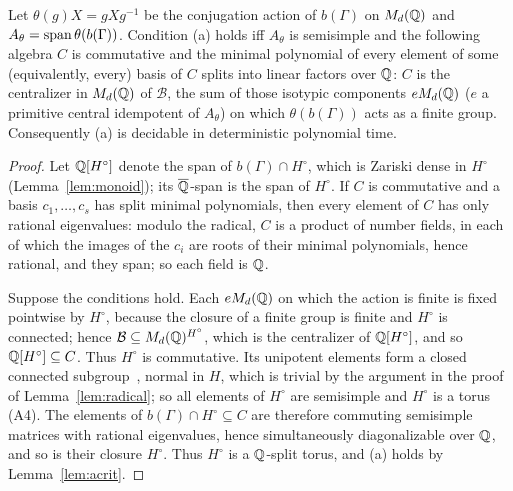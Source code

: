 \begin{lemma}\label{lem:atest}
Let $\theta(g)X=gXg^{-1}$ be the conjugation action of $b(\Gamma)$ on $M_d(\mathbb{Q})$ and
$A_\theta=\operatorname{span}\theta(b(\Gamma))$. Condition (a) holds iff $A_\theta$ is semisimple and the following
algebra $C$ is commutative and the minimal polynomial of every element of some (equivalently, every)
basis of $C$ splits into linear factors over $\mathbb{Q}$: $C$ is the centralizer in $M_d(\mathbb{Q})$ of $\mathcal B$,
the sum of those isotypic components $eM_d(\mathbb{Q})$ ($e$ a primitive central idempotent of $A_\theta$) on
which $\theta(b(\Gamma))$ acts as a finite group. Consequently (a) is decidable in deterministic
polynomial time.
\end{lemma}
\begin{proof}
Let $\mathbb{Q}[H^\circ]$ denote the span of $b(\Gamma)\cap H^\circ$, which is Zariski dense in $H^\circ$
(Lemma~\ref{lem:monoid}); its $\overline{\mathbb{Q}}$-span is the span of $H^\circ$. If $C$ is commutative and a basis
$c_1,\ldots,c_s$ has split minimal polynomials, then every element of $C$ has only rational eigenvalues:
modulo the radical, $C$ is a product of number fields, in each of which the images of the $c_i$ are
roots of their minimal polynomials, hence rational, and they span; so each field is $\mathbb{Q}$.

Suppose the conditions hold. Each $eM_d(\mathbb{Q})$ on which the action is finite is fixed pointwise by
$H^\circ$, because the closure of a finite group is finite and $H^\circ$ is connected; hence
$\mathcal B\subseteq M_d(\mathbb{Q})^{H^\circ}$, which is the centralizer of $\mathbb{Q}[H^\circ]$, and so
$\mathbb{Q}[H^\circ]\subseteq C$. Thus $H^\circ$ is commutative. Its unipotent elements form a closed connected
subgroup~\cite[4.7]{Bor91}, normal in $H$, which is trivial by the argument in the proof of
Lemma~\ref{lem:radical}; so all elements of $H^\circ$ are semisimple and $H^\circ$ is a torus (A4). The elements
of $b(\Gamma)\cap H^\circ\subseteq C$ are therefore commuting semisimple matrices with rational
eigenvalues, hence simultaneously diagonalizable over $\mathbb{Q}$, and so is their closure $H^\circ$. Thus
$H^\circ$ is a $\mathbb{Q}$-split torus, and (a) holds by Lemma~\ref{lem:acrit}.


\end{proof}
